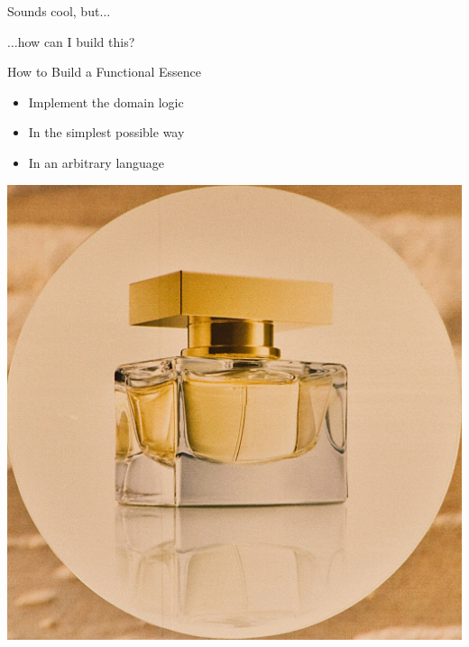\begin{frame}[fragile]{}

\end{frame}


\begin{frame}[fragile]{}

\begin{center}
{\Huge
Sounds cool, but$\ldots$

\vspace{1.5em}
$\ldots$how can I build this?
}
\end{center}

\end{frame}

\begin{frame}[fragile]{How to Build a Functional Essence}

\begin{itemize}[<+->]
\item Implement the domain logic
\item In the simplest possible way
\item In an arbitrary language
\end{itemize}

\vspace{2em}

\onslide<+->
\begin{center}
\includegraphics[width=.3\textwidth]{images/essence_large.jpg}
\end{center}

\end{frame}

